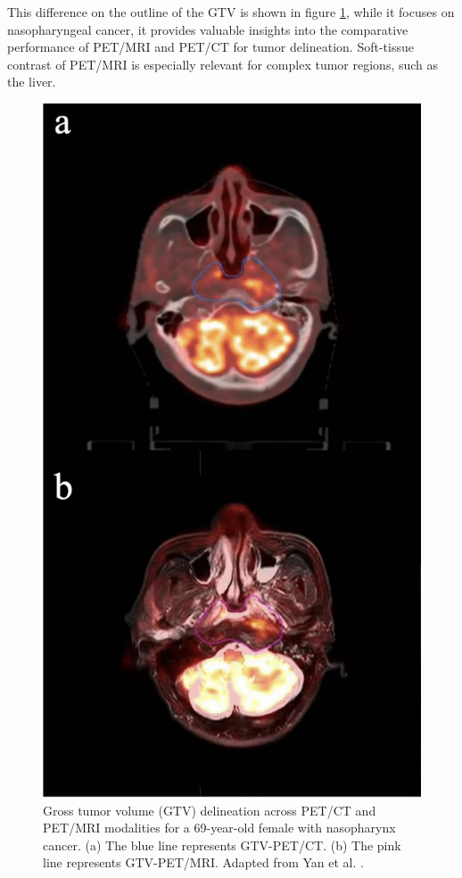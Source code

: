 \begin{multicols}{2}
This difference on the outline of the GTV is shown in figure \ref{fig:gtv_delineation_cropped}, while it focuses on nasopharyngeal cancer, it provides valuable insights into the comparative performance of PET/MRI and PET/CT for tumor delineation. Soft-tissue contrast of PET/MRI is especially relevant for complex tumor regions, such as the liver.




\begin{figure}[H]
	\centering
	\includegraphics[width=0.8\columnwidth]{assets/GTV_Delineation_PETCT_vs_PETMRI.png} 
	\caption{Gross tumor volume (GTV) delineation across PET/CT and PET/MRI modalities for a 69-year-old female with nasopharynx cancer. (a) The blue line represents GTV-PET/CT. (b) The pink line represents GTV-PET/MRI. Adapted from Yan et al. \cite{yan2024}.}
	\label{fig:gtv_delineation_cropped}
\end{figure}


\end{multicols}
